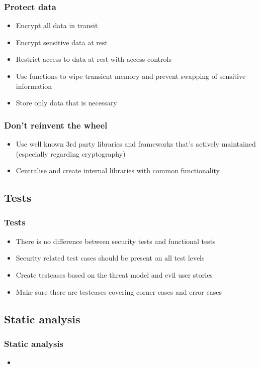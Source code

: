 \documentclass{beamer}
\begin{document}
    \begin{frame}
      \frametitle{Protect data}
      \begin{itemize}
        \item Encrypt all data in transit
        \item Encrypt sensitive data at rest
        \item Restrict access to data at rest with access controls
        \item Use functions to wipe transient memory and prevent swapping of sensitive information
        \item Store only data that is necessary
      \end{itemize}
    \end{frame}
    \begin{frame}
      \frametitle{Don't reinvent the wheel}
      \begin{itemize}
        \item Use well known 3rd party libraries and frameworks that's actively maintained (especially regarding cryptography)
        \item Centralise and create internal libraries with common functionality
      \end{itemize}
    \end{frame}
  \subsection{Tests}
    \begin{frame}
      \frametitle{Tests}
      \begin{itemize}
        \item There is no difference between security tests and functional tests
        \item Security related test cases should be present on all test levels
        \item Create testcases based on the threat model and evil user stories
        \item Make sure there are testcases covering corner cases and error cases
      \end{itemize}
    \end{frame}

  \subsection{Static analysis}
    \begin{frame}
    \frametitle{Static analysis}
    \begin{itemize}
    \item
    \end{itemize}
    \end{frame}
\end{document}

